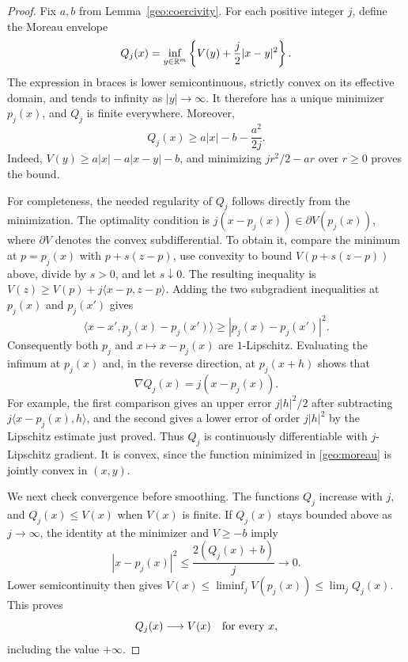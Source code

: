 \begin{proof}
Fix $a,b$ from Lemma~\ref{geo:coercivity}.  For each positive integer $j$,
define the Moreau envelope \cite[Section~7]{Moreau1965}
\begin{equation}\label{geo:moreau}
  Q_j(x)=\inf_{y\in\mathbb R^m}\left\{V(y)+\frac j2|x-y|^2\right\}.
\end{equation}
The expression in braces is lower semicontinuous, strictly convex on its
effective domain, and tends to infinity as $|y|\to\infty$.  It therefore
has a unique minimizer $p_j(x)$, and $Q_j$ is finite everywhere.  Moreover,
\begin{equation}\label{geo:envelope-lower}
  Q_j(x)\geq a|x|-b-\frac{a^2}{2j}.
\end{equation}
Indeed, $V(y)\geq a|x|-a|x-y|-b$, and minimizing
$jr^2/2-ar$ over $r\geq0$ proves the bound.

For completeness, the needed regularity of $Q_j$ follows directly from
the minimization.  The optimality condition is
$j(x-p_j(x))\in\partial V(p_j(x))$, where $\partial V$ denotes the convex
subdifferential.  To obtain it, compare the minimum at $p=p_j(x)$ with
$p+s(z-p)$, use convexity to bound $V(p+s(z-p))$ above, divide by $s>0$,
and let $s\downarrow0$.  The resulting inequality is
$V(z)\geq V(p)+j\langle x-p,z-p\rangle$.
Adding the two subgradient inequalities at $p_j(x)$ and
$p_j(x')$ gives
\[
  \langle x-x',p_j(x)-p_j(x')\rangle
  \geq |p_j(x)-p_j(x')|^2.
\]
Consequently both $p_j$ and $x\mapsto x-p_j(x)$ are $1$-Lipschitz.
Evaluating the infimum at $p_j(x)$ and, in the reverse direction, at
$p_j(x+h)$ shows that
\[
  \nabla Q_j(x)=j(x-p_j(x)).
\]
For example, the first comparison gives an upper error $j|h|^2/2$
after subtracting $j\langle x-p_j(x),h\rangle$, and the second gives
a lower error of order $j|h|^2$ by the Lipschitz estimate just proved.
Thus $Q_j$ is continuously differentiable with $j$-Lipschitz gradient.
It is convex, since the function minimized in \eqref{geo:moreau} is jointly
convex in $(x,y)$.

We next check convergence before smoothing.  The functions $Q_j$ increase
with $j$, and $Q_j(x)\leq V(x)$ when $V(x)$ is finite.  If $Q_j(x)$ stays
bounded above as $j\to\infty$, the identity at the minimizer and $V\geq-b$
imply
\[
  |x-p_j(x)|^2\leq\frac{2(Q_j(x)+b)}j\longrightarrow0.
\]
Lower semicontinuity then gives
$V(x)\leq\liminf_j V(p_j(x))\leq\lim_jQ_j(x)$.
This proves
\begin{equation}\label{geo:envelope-limit}
  Q_j(x)\longrightarrow V(x)\quad\hbox{for every }x,
\end{equation}
including the value $+\infty$.


\end{proof}
